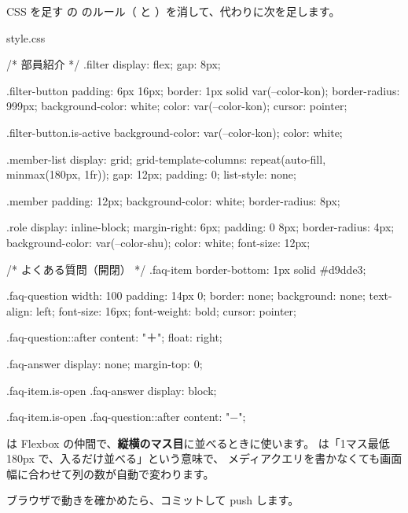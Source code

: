 \begin{step}{CSS を足す}
 の  のルール（ と ）を消して、代わりに次を足します。
\begin{filebox}{style.css}
\begin{Piton}[language=code]
/* 部員紹介 */
.filter {
  display: flex;
  gap: 8px;
}

.filter-button {
  padding: 6px 16px;
  border: 1px solid var(--color-kon);
  border-radius: 999px;
  background-color: white;
  color: var(--color-kon);
  cursor: pointer;
}

.filter-button.is-active {
  background-color: var(--color-kon);
  color: white;
}

.member-list {
  display: grid;
  grid-template-columns: repeat(auto-fill, minmax(180px, 1fr));
  gap: 12px;
  padding: 0;
  list-style: none;
}

.member {
  padding: 12px;
  background-color: white;
  border-radius: 8px;
}

.role {
  display: inline-block;
  margin-right: 6px;
  padding: 0 8px;
  border-radius: 4px;
  background-color: var(--color-shu);
  color: white;
  font-size: 12px;
}

/* よくある質問（開閉） */
.faq-item {
  border-bottom: 1px solid #d9dde3;
}

.faq-question {
  width: 100%
  padding: 14px 0;
  border: none;
  background: none;
  text-align: left;
  font-size: 16px;
  font-weight: bold;
  cursor: pointer;
}

.faq-question::after {
  content: "＋";
  float: right;
}

.faq-answer {
  display: none;
  margin-top: 0;
}

.faq-item.is-open .faq-answer {
  display: block;
}

.faq-item.is-open .faq-question::after {
  content: "−";
}

\end{Piton}
\end{filebox}
 は Flexbox の仲間で、\textbf{縦横のマス目}に並べるときに使います。
 は「1マス最低 180px で、入るだけ並べる」という意味で、
メディアクエリを書かなくても画面幅に合わせて列の数が自動で変わります。
\end{step}

ブラウザで動きを確かめたら、コミットして push します。


